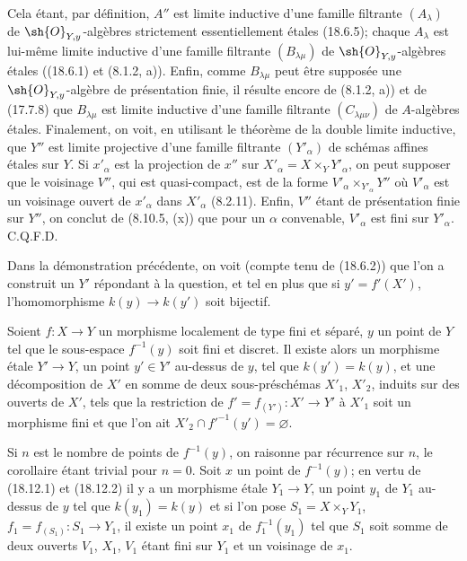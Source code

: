 Cela étant, par définition, $A''$ est limite inductive d'une famille filtrante $(A_\lambda)$ de $\sh{O}_{Y,y}$-algèbres strictement essentiellement étales (18.6.5); chaque $A_\lambda$ est lui-même limite inductive d'une famille filtrante $(B_{\lambda\mu})$ de $\sh{O}_{Y,y}$-algèbres étales ((18.6.1) et (8.1.2, a)). Enfin, comme $B_{\lambda\mu}$ peut être supposée une $\sh{O}_{Y,y}$-algèbre de présentation finie, il résulte encore de (8.1.2, a)) et de (17.7.8) que $B_{\lambda\mu}$ est limite inductive d'une famille filtrante $(C_{\lambda\mu\nu})$ de $A$-algèbres étales. Finalement, on voit, en utilisant le théorème de la double limite inductive, que $Y''$ est limite projective d'une famille filtrante $(Y'_\alpha)$ de schémas affines étales sur $Y$. Si $x'_\alpha$ est la projection de $x''$ sur $X'_\alpha=X\times_Y Y'_\alpha$, on peut supposer que le voisinage $V''$, qui est quasi-compact, est de la forme $V'_\alpha\times_{Y'_\alpha}Y''$ où $V'_\alpha$ est un voisinage ouvert de $x'_\alpha$ dans $X'_\alpha$ (8.2.11). Enfin, $V''$ étant de présentation finie sur $Y''$, on conclut de (8.10.5, (x)) que pour un $\alpha$ convenable, $V'_\alpha$ est fini sur $Y'_\alpha$. C.Q.F.D.

\begin{remark}[18.12.2]
\label{IV.18.12.2}
Dans la démonstration précédente, on voit (compte tenu de (18.6.2)) que l'on a construit un $Y'$ répondant à la question, et tel en plus que si $y'=f'(X')$, l'homomorphisme $k(y)\to k(y')$ soit bijectif.
\end{remark}

\begin{corollary}[18.12.3]
\label{IV.18.12.3}
Soient $f:X\to Y$ un morphisme localement de type fini et séparé, $y$ un point de $Y$ tel que le sous-espace $f^{-1}(y)$ soit fini et discret. Il existe alors un morphisme étale $Y'\to Y$, un point $y'\in Y'$ au-dessus de $y$, tel que $k(y')=k(y)$, et une décomposition de $X'$ en somme de deux sous-préschémas $X'_1$, $X'_2$, induits sur des ouverts de $X'$, tels que la restriction de $f'=f_{(Y')}:X'\to Y'$ à $X'_1$ soit un morphisme fini et que l'on ait $X'_2\cap f'^{-1}(y')=\varnothing$.
\end{corollary}

Si $n$ est le nombre de points de $f^{-1}(y)$, on raisonne par récurrence sur $n$, le corollaire étant trivial pour $n=0$. Soit $x$ un point de $f^{-1}(y)$; en vertu de (18.12.1) et (18.12.2) il y a un morphisme étale $Y_1\to Y$, un point $y_1$ de $Y_1$ au-dessus de $y$ tel que $k(y_1)=k(y)$ et si l'on pose $S_1=X\times_Y Y_1$, $f_1=f_{(S_1)}:S_1\to Y_1$, il existe un point $x_1$ de $f_1^{-1}(y_1)$ tel que $S_1$ soit somme de deux ouverts $V_1$, $X_1$, $V_1$ étant fini sur $Y_1$ et un voisinage de $x_1$.

